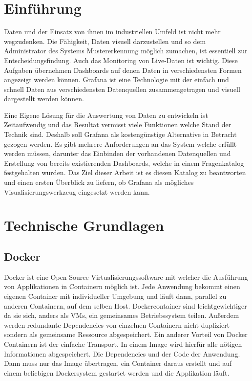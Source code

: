 \documentclass[a4paper, 12pt, oneside]{scrbook}
\begin{document}
	\frontmatter
	
	\tableofcontents
	\listoffigures
	\nocite{*}

	\mainmatter

	\pagebreak
	\chapter{Einführung}
	
	\noindent Daten und der Einsatz von ihnen im industriellen Umfeld ist nicht mehr wegzudenken. Die Fähigkeit, Daten visuell darzustellen und so dem Administrator des Systems Mustererkennung möglich zumachen, ist essentiell zur Entscheidungsfindung. Auch das Monitoring von Live-Daten ist wichtig. Diese Aufgaben übernehmen Dashboards auf denen Daten in verschiedensten Formen angezeigt werden können. Grafana ist eine Technologie mit der einfach und schnell Daten aus verschiedensten Datenquellen zusammengetragen und visuell dargestellt werden können. 
	
	\noindent Eine Eigene Lösung für die Auswertung von Daten zu entwickeln ist Zeitaufwendig und das Resultat vermisst viele Funktionen welche Stand der Technik sind. Deshalb soll Grafana als kostengünstige Alternative in Betracht gezogen werden. Es gibt mehrere Anforderungen an das System welche erfüllt werden müssen, darunter das Einbinden der vorhandenen Datenquellen und Erstellung von bereits existierenden Dashboards, welche in einem Fragenkatalog festgehalten wurden. Das Ziel dieser Arbeit ist es diesen Katalog zu beantworten und einen ersten Überblick zu liefern, ob Grafana als mögliches Visualisierungswerkzeug eingesetzt werden kann.
		
	\chapter{Technische Grundlagen}
	
		\section{Docker}
			\noindent Docker ist eine Open Source Virtualisierungssoftware mit welcher die Ausführung von Applikationen in Containern möglich ist. Jede Anwendung bekommt einen eigenen Container mit individueller Umgebung und läuft dann, parallel zu anderen Containern, auf dem selben Host. Dockercontainer sind leichtgewichtiger da sie sich, anders als VMs, ein gemeinsames Betriebssystem teilen. Außerdem werden redundante Dependencies von einzelnen Containern nicht dupliziert sondern als gemeinsame Ressource abgespeichert. Ein anderer Vorteil von Docker Containern ist der einfache Transport. In einem Image wird hierfür alle nötigen Informationen abgespeichert. Die Dependencies und der Code der Anwendung. Dann muss nur das Image übertragen, ein Container daraus erstellt und auf einem beliebigen Dockersystem gestartet werden und die Applikation läuft.
			
\end{document}
